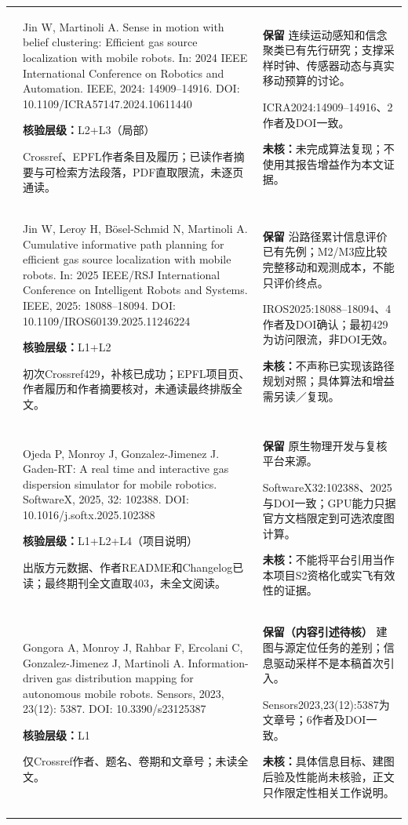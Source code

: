 \begin{longtable}{@{}>{\raggedright\arraybackslash}p{0.7cm}>{\raggedright\arraybackslash}p{7.0cm}>{\raggedright\arraybackslash}p{7.8cm}@{}}
5 & Jin W, Martinoli A. Sense in motion with belief clustering: Efficient gas source localization with mobile robots. In: 2024 IEEE International Conference on Robotics and Automation. IEEE, 2024: 14909–14916. DOI: 10.1109/ICRA57147.2024.10611440\par\textbf{核验层级：}L2+L3（局部）\par Crossref、EPFL作者条目及履历；已读作者摘要与可检索方法段落，PDF直取限流，未逐页通读。 & \textbf{保留} 连续运动感知和信念聚类已有先行研究；支撑采样时钟、传感器动态与真实移动预算的讨论。\par ICRA2024:14909–14916、2作者及DOI一致。\par\textbf{未核：}未完成算法复现；不使用其报告增益作为本文证据。 \\\addlinespace[6pt]
6 & Jin W, Leroy H, Bösel-Schmid N, Martinoli A. Cumulative informative path planning for efficient gas source localization with mobile robots. In: 2025 IEEE/RSJ International Conference on Intelligent Robots and Systems. IEEE, 2025: 18088–18094. DOI: 10.1109/IROS60139.2025.11246224\par\textbf{核验层级：}L1+L2\par 初次Crossref429，补核已成功；EPFL项目页、作者履历和作者摘要核对，未通读最终排版全文。 & \textbf{保留} 沿路径累计信息评价已有先例；M2/M3应比较完整移动和观测成本，不能只评价终点。\par IROS2025:18088–18094、4作者及DOI确认；最初429为访问限流，非DOI无效。\par\textbf{未核：}不声称已实现该路径规划对照；具体算法和增益需另读／复现。 \\\addlinespace[6pt]
7 & Ojeda P, Monroy J, Gonzalez-Jimenez J. Gaden-RT: A real time and interactive gas dispersion simulator for mobile robotics. SoftwareX, 2025, 32: 102388. DOI: 10.1016/j.softx.2025.102388\par\textbf{核验层级：}L1+L2+L4（项目说明）\par 出版方元数据、作者README和Changelog已读；最终期刊全文直取403，未全文阅读。 & \textbf{保留} 原生物理开发与复核平台来源。\par SoftwareX32:102388、2025与DOI一致；GPU能力只据官方文档限定到可选浓度图计算。\par\textbf{未核：}不能将平台引用当作本项目S2资格化或实飞有效性的证据。 \\\addlinespace[6pt]
8 & Gongora A, Monroy J, Rahbar F, Ercolani C, Gonzalez-Jimenez J, Martinoli A. Information-driven gas distribution mapping for autonomous mobile robots. Sensors, 2023, 23(12): 5387. DOI: 10.3390/s23125387\par\textbf{核验层级：}L1\par 仅Crossref作者、题名、卷期和文章号；未读全文。 & \textbf{保留（内容引述待核）} 建图与源定位任务的差别；信息驱动采样不是本稿首次引入。\par Sensors2023,23(12):5387为文章号；6作者及DOI一致。\par\textbf{未核：}具体信息目标、建图后验及性能尚未核验，正文只作限定性相关工作说明。 \\\addlinespace[6pt]

\end{longtable}
